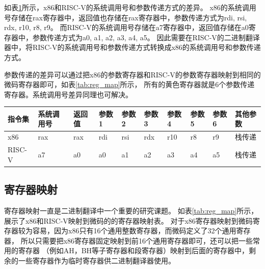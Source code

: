 如表\ref{tab:syscall}所示，x86和RISC-V的系统调用号和参数传递方式的差异。
x86的系统调用号存储在rax寄存器中，返回值也存储在rax寄存器中，参数传递方式为rdi, rsi, rdx, r10, r8, r9。
而RISC-V的系统调用号存储在a7寄存器中，返回值存储在a0寄存器中，参数传递方式为a0, a1, a2, a3, a4, a5。
因此需要在RISC-V的二进制翻译器中，将RISC-V的系统调用号和参数传递方式转换成x86的系统调用号和参数传递方式。

参数传递的差异可以通过把x86的参数寄存器和RISC-V的参数寄存器映射到相同的微码寄存器即可，如表\ref{tab:reg_map}所示，
所有的黄色寄存器就是6个参数传递寄存器。系统调用号差异同理也可解决。



\begin{table}[h]
    \centering
    \footnotesize%
    \setlength{\tabcolsep}{4pt}%
    \renewcommand{\arraystretch}{1.2}%
      \begin{tabular}{llllllllll}
      \hline
      指令集 & 系统调用号 & 返回值 & 参数1 & 参数2 & 参数3 & 参数4 & 参数5 & 参数6 & 其他参数 \\ \hline
      x86     & rax    & rax   & rdi & rsi & rdx & r10 & r8  & r9  & 栈传递  \\
      RISC-V  & a7     & a0    & a0  & a1  & a2  & a3  & a4  & a5  & 栈传递 \\
      \hline
      \end{tabular}
    \label{tab:syscall}
  \end{table}
  

\subsection{寄存器映射}

寄存器映射一直是二进制翻译中一个重要的研究课题。
如表\ref{tab:reg_map}所示，展示了x86和RISC-V映射到微码的的寄存器映射表。
对于x86寄存器映射到微码寄存器较为容易，因为x86只有16个通用整数寄存器，而微码定义了32个通用寄存器，
所以只需要把x86寄存器固定映射到前16个通用寄存器即可，还可以把一些常用的寄存器
（例如AH，BH等子寄存器和段寄存器）映射到后面的寄存器中，剩余的一些寄存器作为临时寄存器供二进制翻译器使用。

